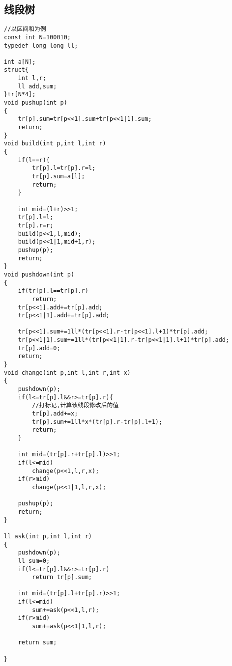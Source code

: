 \documentclass[twocolumn,a4]{article}
\begin{document}
\subsection{线段树}
\begin{lstlisting}
//以区间和为例
const int N=100010;
typedef long long ll;

int a[N];
struct{
    int l,r;
    ll add,sum;
}tr[N*4];
void pushup(int p)
{
    tr[p].sum=tr[p<<1].sum+tr[p<<1|1].sum;
    return;
}
void build(int p,int l,int r)
{
    if(l==r){
        tr[p].l=tr[p].r=l;
        tr[p].sum=a[l];
        return;
    }
    
    int mid=(l+r)>>1;
    tr[p].l=l;
    tr[p].r=r;
    build(p<<1,l,mid);
    build(p<<1|1,mid+1,r);
    pushup(p);
    return;
}
void pushdown(int p)
{
    if(tr[p].l==tr[p].r)
        return;
    tr[p<<1].add+=tr[p].add;
    tr[p<<1|1].add+=tr[p].add;
    
    tr[p<<1].sum+=1ll*(tr[p<<1].r-tr[p<<1].l+1)*tr[p].add;
    tr[p<<1|1].sum+=1ll*(tr[p<<1|1].r-tr[p<<1|1].l+1)*tr[p].add;
    tr[p].add=0;
    return;
}
void change(int p,int l,int r,int x)
{
    pushdown(p);
    if(l<=tr[p].l&&r>=tr[p].r){
        //打标记,计算该线段修改后的值
        tr[p].add+=x;
        tr[p].sum+=1ll*x*(tr[p].r-tr[p].l+1);
        return;
    }
    
    int mid=(tr[p].r+tr[p].l)>>1;
    if(l<=mid)
        change(p<<1,l,r,x);
    if(r>mid)
        change(p<<1|1,l,r,x);
    
    pushup(p);
    return;
}

ll ask(int p,int l,int r)
{
    pushdown(p);
    ll sum=0;
    if(l<=tr[p].l&&r>=tr[p].r)
        return tr[p].sum;
    
    int mid=(tr[p].l+tr[p].r)>>1;
    if(l<=mid)
        sum+=ask(p<<1,l,r);
    if(r>mid)
        sum+=ask(p<<1|1,l,r);
    
    return sum;
    
}
\end{lstlisting}
\end{document}
